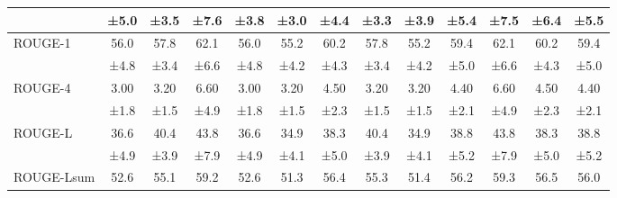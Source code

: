 \documentclass[letterpaper]{article} %
\begin{document}
\begin{table}[t]
\begin{tabular}{l@{\hspace{5mm}}*{3}{c}@{\hspace{5mm}}*{3}{c}@{\hspace{5mm}}*{3}{c}@{\hspace{5mm}}*{3}{c}}
                    & {\footnotesize ±5.0} & {\footnotesize ±3.5} & {\footnotesize ±7.6} & {\footnotesize ±3.8} & {\footnotesize ±3.0} & {\footnotesize ±4.4} & {\footnotesize ±3.3} & {\footnotesize ±3.9} & {\footnotesize ±5.4} & {\footnotesize ±7.5} & {\footnotesize ±6.4} & {\footnotesize ±5.5} \\
    \hline
    \multirow{2}{*}{ROUGE-1} & {\normalsize 56.0} & {\normalsize 57.8} & {\normalsize 62.1} & {\normalsize 56.0} & {\normalsize 55.2} & {\normalsize 60.2} & {\normalsize 57.8} & {\normalsize 55.2} & {\normalsize 59.4} & {\normalsize 62.1} & {\normalsize 60.2} & {\normalsize 59.4} \\
                     & {\footnotesize ±4.8} & {\footnotesize ±3.4} & {\footnotesize ±6.6} & {\footnotesize ±4.8} & {\footnotesize ±4.2} & {\footnotesize ±4.3} & {\footnotesize ±3.4} & {\footnotesize ±4.2} & {\footnotesize ±5.0} & {\footnotesize ±6.6} & {\footnotesize ±4.3} & {\footnotesize ±5.0} \\
    \hline
    \multirow{2}{*}{ROUGE-4} & {\normalsize 3.00} & {\normalsize 3.20} & {\normalsize 6.60} & {\normalsize 3.00} & {\normalsize 3.20} & {\normalsize 4.50} & {\normalsize 3.20} & {\normalsize 3.20} & {\normalsize 4.40} & {\normalsize 6.60} & {\normalsize 4.50} & {\normalsize 4.40} \\
                     & {\footnotesize ±1.8} & {\footnotesize ±1.5} & {\footnotesize ±4.9} & {\footnotesize ±1.8} & {\footnotesize ±1.5} & {\footnotesize ±2.3} & {\footnotesize ±1.5} & {\footnotesize ±1.5} & {\footnotesize ±2.1} & {\footnotesize ±4.9} & {\footnotesize ±2.3} & {\footnotesize ±2.1} \\
    \hline
    \multirow{2}{*}{ROUGE-L} & {\normalsize 36.6} & {\normalsize 40.4} & {\normalsize 43.8} & {\normalsize 36.6} & {\normalsize 34.9} & {\normalsize 38.3} & {\normalsize 40.4} & {\normalsize 34.9} & {\normalsize 38.8} & {\normalsize 43.8} & {\normalsize 38.3} & {\normalsize 38.8} \\
                     & {\footnotesize ±4.9} & {\footnotesize ±3.9} & {\footnotesize ±7.9} & {\footnotesize ±4.9} & {\footnotesize ±4.1} & {\footnotesize ±5.0} & {\footnotesize ±3.9} & {\footnotesize ±4.1} & {\footnotesize ±5.2} & {\footnotesize ±7.9} & {\footnotesize ±5.0} & {\footnotesize ±5.2} \\
    \hline
    \multirow{2}{*}{ROUGE-Lsum} & {\normalsize 52.6} & {\normalsize 55.1} & {\normalsize 59.2} & {\normalsize 52.6} & {\normalsize 51.3} & {\normalsize 56.4} & {\normalsize 55.3} & {\normalsize 51.4} & {\normalsize 56.2} & {\normalsize 59.3} & {\normalsize 56.5} & {\normalsize 56.0} \\

\end{tabular}
\end{table}
\end{document}
